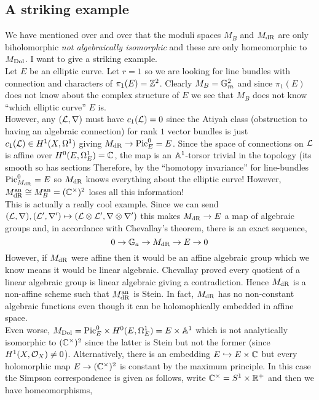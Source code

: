 \documentclass[12pt]{article}
\begin{document}
\subsection{A striking example}

We have mentioned over and over that the moduli spaces $M_B$ and $M_{\mathrm{dR}}$ are only biholomorphic 
\textit{not algebraically isomorphic} and these are only homeomorphic to $M_{\mathrm{Dol}}$. I want to give a striking example.
\bigskip\\
Let $E$ be an elliptic curve. Let $r = 1$ so we are looking for line bundles with connection and characters of $\pi_1(E) = \mathbb{Z}^2$. Clearly $M_B = \mathbb{G}_m^2$ and since $\pi_1(E)$ does not know about the complex structure of $E$ we see that $M_B$ does not know ``which elliptic curve'' $E$ is.
\bigskip\\
However, any $(\mathcal{L}, \nabla)$ must have $c_1(\mathcal{L}) = 0$ since the Atiyah class (obstruction to having an algebraic connection) for rank $1$ vector bundles is just $c_1(\mathcal{L}) \in H^1(X, \Omega^1)$ giving $M_{\mathrm{dR}} \to \mathrm{Pic}^0_E = E$. Since the space of connections on $\mathcal{L}$ is affine over $H^0(E, \Omega_E^1) = \mathbb{C}$, the map is an $\mathbb{A}^1$-torsor trivial in the \etale topology (its smooth so has \etale sections Therefore, by the ``homotopy invariance'' for line-bundles $\mathrm{Pic}_{M_{\mathrm{dR}}}^0 = E$ so $M_{\mathrm{dR}}$ knows everything about the elliptic curve! However, $M_{\mathrm{dR}}^{\mathrm{an}} \cong M_B^{\mathrm{an}} = (\mathbb{C}^\times)^2$ loses all this information!
\bigskip\\
This is actually a really cool example. Since we can send $(\mathcal{L}, \nabla), (\mathcal{L}', \nabla') \mapsto (\mathcal{L} \otimes \mathcal{L}', \nabla \otimes \nabla')$ this makes $M_{\mathrm{dR}} \to E$ a map of algebraic groups and, in accordance with Chevallay's theorem, there is an exact sequence,
\[ 0 \to \mathbb{G}_a \to M_{\mathrm{dR}} \to E \to 0 \]
However, if $M_{\mathrm{dR}}$ were affine then it would be an affine algebraic group which we know means it would be linear algebraic. Chevallay proved every quotient of a linear algebraic group is linear algebraic giving a contradiction. Hence $M_{\mathrm{dR}}$ is a non-affine scheme such that $M_{\mathrm{dR}}^{\mathrm{an}}$ is Stein. In fact, $M_{\mathrm{dR}}$ has no non-constant algebraic functions even though it can be holomophically embedded in affine space.
\bigskip\\
Even worse, $M_{\mathrm{Dol}} = \mathrm{Pic}^0_{E} \times H^0(E, \Omega^1_E) = E \times \mathbb{A}^1$ which is not analytically isomorphic to $(\mathbb{C}^\times)^2$ since the latter is Stein but not the former (since $H^1(X, \mathcal{O}_{X}) \neq 0$). Alternatively, there is an embedding $E \hookrightarrow E \times \mathbb{C}$ but every holomorphic map $E \to (\mathbb{C}^\times)^2$ is constant by the maximum principle. In this case the Simpson correspondence is given as follows, write $\mathbb{C}^\times = S^1 \times \mathbb{R}^+$ and then we have homeomorphisms,
\end{document}
